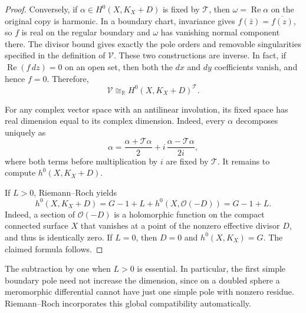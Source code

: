 \documentclass[11pt]{amsart}
\numberwithin{equation}{section}
\theoremstyle{definition}
\theoremstyle{remark}
\newcommand{\R}{\mathbb R}
\DeclareMathOperator{\Rea}{Re}
\begin{document}
\begin{proof}
Conversely, if $\alpha\in H^0(X,K_X+D)$ is fixed by $\mathcal T$,
then $\omega=\Rea\alpha$ on the original copy is harmonic. In a
boundary chart, invariance gives
$f(\bar z)=\overline{f(z)}$, so $f$ is real on the regular boundary
and $\omega$ has vanishing normal component there. The divisor
bound gives exactly the pole orders and removable singularities
specified in the definition of $\mathcal V$. These two
constructions are inverse. In fact, if $\Rea(f\,dz)=0$ on an open set, then
both the $dx$ and $dy$ coefficients vanish, and hence $f=0$.
Therefore,
\[
\mathcal V\cong_{\R}
H^0(X,K_X+D)^{\mathcal T}.
\]

For any complex vector space with an antilinear involution, its
fixed space has real dimension equal to its complex dimension.
Indeed, every $\alpha$ decomposes uniquely as
\[
\alpha=
\frac{\alpha+\mathcal T\alpha}{2}
+i\,\frac{\alpha-\mathcal T\alpha}{2i},
\]
where both terms before multiplication by $i$ are fixed by
$\mathcal T$. It remains to compute $h^0(X,K_X+D)$.

If $L>0$, Riemann--Roch yields
\[
h^0(X,K_X+D)=G-1+L+h^0(X,\mathcal O(-D))
            =G-1+L.
\]
Indeed, a section of $\mathcal O(-D)$ is a holomorphic function
on the compact connected surface $X$ that vanishes at a point
of the nonzero effective divisor $D$, and thus is identically
zero. If $L=0$, then $D=0$ and $h^0(X,K_X)=G$. The claimed
formula follows.
\end{proof}

The subtraction by one when $L>0$ is essential. In particular,
the first simple boundary pole need not increase the dimension, since
on a doubled sphere a meromorphic differential cannot have just
one simple pole with nonzero residue. Riemann--Roch incorporates
this global compatibility automatically.
\end{document}

